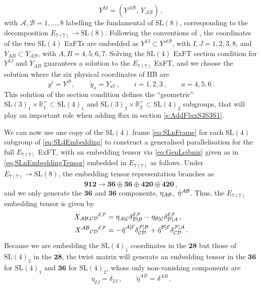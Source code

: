 \documentclass[a4paper, 11pt]{article}
\numberwithin{equation}{section}
\newcommand{\SL}[1]{\mathrm{SL}( #1 )}
\newcommand{\En}[1]{E_{#1(#1)}}
\newcommand{\+}{\oplus}
\newcommand{\cA}{\mathcal{A}}
\newcommand{\cB}{\mathcal{B}}
\newcommand{\cC}{\mathcal{C}}
\begin{document}
\begin{equation}
	Y^M = \left( Y^{\cA\cB} ,\, Y_{\cA\cB} \right) \,,
\end{equation}
with $\cA, \cB = 1, \ldots, 8$ labelling the fundamental of $\SL{8}$, corresponding to the decomposition $\En{7} \rightarrow \SL{8}$. Following the conventions of \cite{Inverso:2016eet}, the coordinates of the two $\SL{4}$ ExFTs are embedded as $Y^{IJ} \subset Y^{\cA\cB}$, with $I, J = 1, 2, 3, 8$, and $Y_{AB} \subset Y_{\cA\cB}$, with $A, B = 4, 5, 6, 7$. Solving the $\SL{4}$ ExFT section condition for $Y^{IJ}$ and $Y_{AB}$ guarantees a solution to the $\En{7}$ ExFT, and we choose the solution where the six physical coordinates of IIB are
\begin{equation} \label{eq:PhysicalCoords}
	y^i = Y^{i8},\, \qquad \tilde{y}_a = Y_{a7} \,, \qquad i = 1, 2, 3 \,, \qquad a = 4, 5, 6 \,.
\end{equation}
This solution of the section condition defines the ``geometric'' $\SL{3}_1 \times \mathbb{R}^+_1 \subset \SL{4}_1$ and $\SL{3}_2 \times \mathbb{R}^+_2 \subset \SL{4}_2$ subgroups, that will play an important role when adding flux in section \ref{s:AddFluxS3S3S1}.

We can now use one copy of the $\SL{4}$ frame \eqref{eq:SLnFrame} for each $\SL{4}$ subgroup of \eqref{eq:SL4Embedding} to construct a generalised parallelisation for the full $\En{7}$ ExFT, with an embedding tensor via \eqref{eq:GenLeibniz} given as in \eqref{eq:SLnEmbeddingTensor} embedded in $\En{7}$ as follows. Under $\En{7} \rightarrow \SL{8}$, the embedding tensor representation branches as
\begin{equation}
	\mathbf{912} \rightarrow \mathbf{36} \oplus \overline{\mathbf{36}} \oplus \mathbf{420} \oplus \overline{\mathbf{420}} \,,
\end{equation}
and we only generate the $\mathbf{36}$ and $\overline{\mathbf{36}}$ components, $\eta_{{\cal AB}}$, $\tilde{\eta}^{{\cal AB}}$. Thus, the $\En{7}$ embedding tensor is given by
\begin{equation}
	\begin{split}
		X_{{\cal AB, CD}}{}^{\cal EF} &= \eta_{\cA[\cC} \delta_{{\cal D}]\cB}^{{\cal EF}} - \eta_{\cB[\cC} \delta_{{\cal D}]\cA}^{{\cal EF}} \,, \\
		X^{{\cal AB}}{}_{{\cal CD}}{}^{\cal EF} &= -\tilde{\eta}^{\cA[{\cal E}}_{\phantom{[\cA]}} \delta_{\cC{\cal D}}^{{\cal F}]{\cal B}} + \tilde{\eta}^{\cB[{\cal E}}_{\phantom{[\cA]}} \delta_{\cC{\cal D}}^{{\cal F}]{\cal A}} \,.
	\end{split}
\end{equation}
Because we are embedding the $\SL{4}_1$ coordinates in the $\mathbf{28}$ but those of $\SL{4}_2$ in the $\overline{\mathbf{28}}$, the twist matrix will generate an embedding tensor in the $\mathbf{36}$ for $\SL{4}_1$ and $\overline{\mathbf{36}}$ for $\SL{4}_2$, whose only non-vanishing components are
\begin{equation}
	\eta_{IJ} = \delta_{IJ} \,, \qquad \tilde{\eta}^{AB} = \delta^{AB} \,.
\end{equation}
\end{document}
